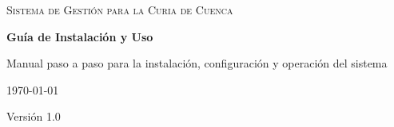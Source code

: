 \documentclass[11pt,a4paper]{report}
\begin{document}
\begin{titlepage}
  \centering
  \vspace*{2cm}
  {\large \textsc{Sistema de Gestión para la Curia de Cuenca}\par}
  \vspace{6cm}
  {\Huge \bfseries Guía de Instalación y Uso\par}
  \vspace{1cm}
  {\Large Manual paso a paso para la instalación, configuración y operación del sistema\par}
  \vfill
  {\large \today\par}
  \vspace{0.3cm}
  {\large Versión 1.0\par}
\end{titlepage}

\setcounter{tocdepth}{1}
\tableofcontents
\newpage







\end{document}
